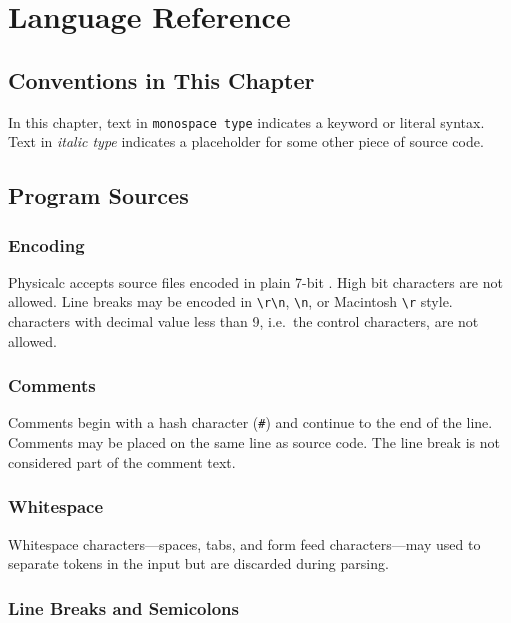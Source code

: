 \chapter{Language Reference}


\section{Conventions in This Chapter}

In this chapter, text in \texttt{monospace type} indicates a keyword
or literal syntax.  Text in \textit{italic type} indicates a
placeholder for some other piece of source code.



\section{Program Sources}
\label{structure}

\subsection{Encoding}

Physicalc accepts source files encoded in plain 7-bit .
High bit characters are not allowed.  Line breaks may be encoded in
 \verb+\r\n+,  \verb+\n+, or Macintosh \verb+\r+
style.   characters with decimal value less than 9,
i.e.\ the control characters, are not allowed.


\subsection{Comments}

Comments begin with a hash character (\verb+#+) and continue to the
end of the line.  Comments may be placed on the same line as source
code.  The line break is not considered part of the comment text.


\subsection{Whitespace}

Whitespace characters---spaces, tabs, and form feed characters---may
used to separate tokens in the input but are discarded during parsing.

\subsection{Line Breaks and Semicolons}

